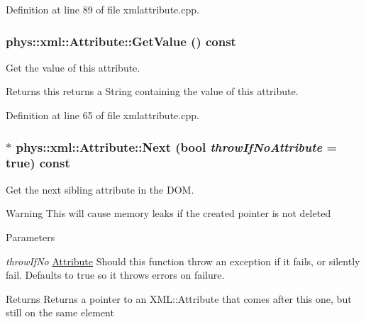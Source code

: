 Definition at line 89 of file xmlattribute.cpp.

\hypertarget{classphys_1_1xml_1_1Attribute_a9fda8a6a6a292639e2ef88c479c80d88}{
\subsubsection[{GetValue}]{ phys::xml::Attribute::GetValue () const}}
\label{da/ddf/classphys_1_1xml_1_1Attribute_a9fda8a6a6a292639e2ef88c479c80d88}


Get the value of this attribute. 

\begin{DoxyReturn}{Returns}
this returns a String containing the value of this attribute. 
\end{DoxyReturn}


Definition at line 65 of file xmlattribute.cpp.

\hypertarget{classphys_1_1xml_1_1Attribute_aadf4930c5c1cd8aa140bea3c05253446}{
\subsubsection[{Next}]{ $\ast$ phys::xml::Attribute::Next (bool {\em throwIfNoAttribute} = {\ttfamily true}) const}}
\label{da/ddf/classphys_1_1xml_1_1Attribute_aadf4930c5c1cd8aa140bea3c05253446}


Get the next sibling attribute in the DOM. 

\begin{DoxyWarning}{Warning}
This will cause memory leaks if the created pointer is not deleted 
\end{DoxyWarning}

\begin{DoxyParams}{Parameters}
\item[{\em throwIfNo}]\hyperlink{classphys_1_1xml_1_1Attribute}{Attribute} Should this function throw an exception if it fails, or silently fail. Defaults to true so it throws errors on failure. \end{DoxyParams}
\begin{DoxyReturn}{Returns}
Returns a pointer to an XML::Attribute that comes after this one, but still on the same element 
\end{DoxyReturn}


